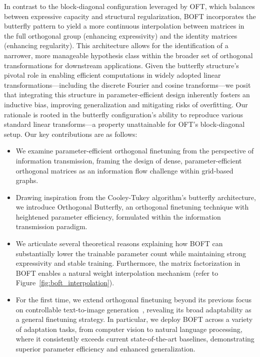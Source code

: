 In contrast to the block-diagonal configuration leveraged by OFT, which balances between expressive capacity and structural regularization, BOFT incorporates the butterfly pattern to yield a more continuous interpolation between matrices in the full orthogonal group (enhancing expressivity) and the identity matrices (enhancing regularity). This architecture allows for the identification of a narrower, more manageable hypothesis class within the broader set of orthogonal transformations for downstream applications. Given the butterfly structure’s pivotal role in enabling efficient computations in widely adopted linear transformations—including the discrete Fourier and cosine transforms—we posit that integrating this structure in parameter-efficient design inherently fosters an inductive bias, improving generalization and mitigating risks of overfitting. Our rationale is rooted in the butterfly configuration’s ability to reproduce various standard linear transforms—a property unattainable for OFT’s block-diagonal setup. Our key contributions are as follows:

\begin{itemize}[leftmargin=*,nosep]
    \item We examine parameter-efficient orthogonal finetuning from the perspective of information transmission, framing the design of dense, parameter-efficient orthogonal matrices as an information flow challenge within grid-based graphs.
    \item Drawing inspiration from the Cooley-Tukey algorithm’s butterfly architecture, we introduce Orthogonal Butterfly, an orthogonal finetuning technique with heightened parameter efficiency, formulated within the information transmission paradigm.
    \item We articulate several theoretical reasons explaining how BOFT can substantially lower the trainable parameter count while maintaining strong expressivity and stable training. Furthermore, the matrix factorization in BOFT enables a natural weight interpolation mechanism (refer to Figure~\ref{fig:boft_interpolation}).
    \item For the first time, we extend orthogonal finetuning beyond its previous focus on controllable text-to-image generation~\cite{qiu2023controlling}, revealing its broad adaptability as a general finetuning strategy. In particular, we deploy BOFT across a variety of adaptation tasks, from computer vision to natural language processing, where it consistently exceeds current state-of-the-art baselines, demonstrating superior parameter efficiency and enhanced generalization.
\end{itemize}

